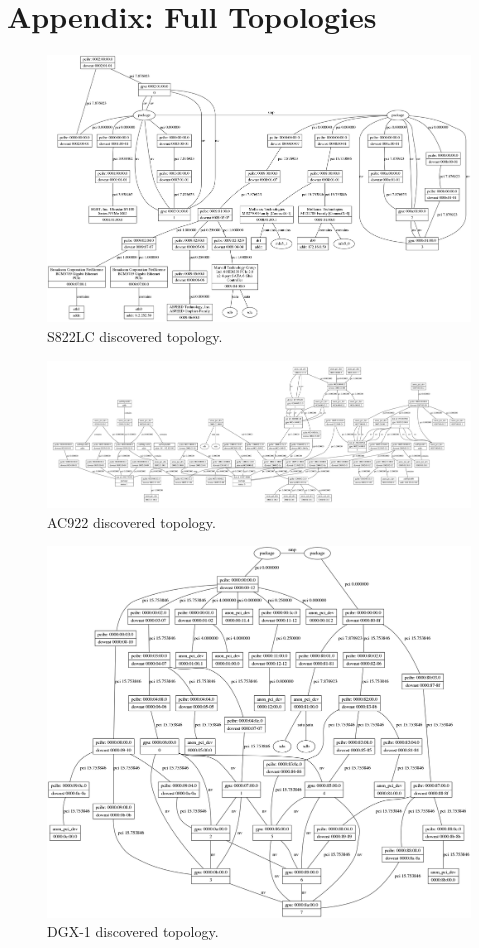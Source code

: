 \chapter{Appendix: Full Topologies}
\label{ch:full-topos}

\begin{figure}[ht]
    \centering
    \includegraphics[width=\textwidth]{figures/topo-minsky-actual.png}
    \caption{S822LC discovered topology.}
    \label{fig:topo-minsky-actual}
\end{figure}

\begin{figure}[ht]
    \centering
    \includegraphics[width=\textwidth]{figures/topo-ac922-actual.pdf}
    \caption{AC922 discovered topology.}
    \label{fig:topo-ac922-actual}
\end{figure}

\begin{figure}[ht]
    \centering
    \includegraphics[width=\textwidth]{figures/topo-dgx1-actual.png}
    \caption{DGX-1 discovered topology.}
    \label{fig:topo-dgx-actual}
\end{figure}
